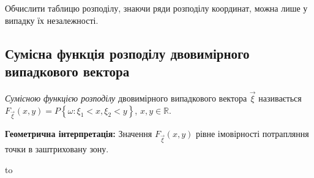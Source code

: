 \begin{remark}
    Обчислити таблицю розподілу, знаючи ряди розподілу координат, можна лише у випадку їх незалежності.
\end{remark}

\subsection{Сумісна функція розподілу двовимірного випадкового вектора}
\begin{definition} 
    \emph{Сумісною функцією розподілу} двовимірного випадкового вектора $\vec{\xi}$ 
    називається $F_{\vec{\xi}}(x, y) = P\left\{\omega: \xi_1 < x, \xi_2 < y\right\}$, $x, y \in \mathbb{R}$.
\end{definition}

\noindent\textbf{Геометрична інтерпретація: }
Значення $F_{\vec{\xi}}(x, y)$ рівне імовірності 
потрапляння точки в заштриховану зону.

\hbox to 

